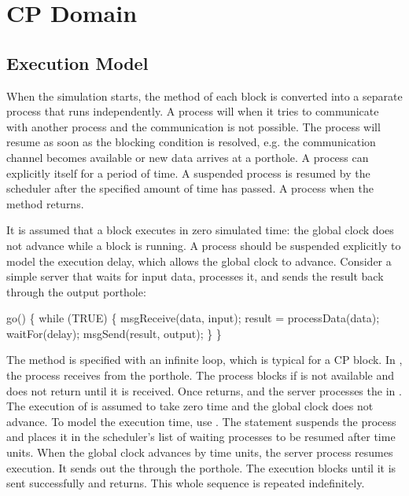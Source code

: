 \chapter{CP Domain}
\label{CP Domain}



\section{Execution Model}
\label{Execution Model}

When the simulation starts, the  method of each block is
converted into a separate process that runs independently.  A process
will  when it tries to communicate with another process and
the communication is not possible.  The process will resume as soon as
the blocking condition is resolved, e.g. the communication channel
becomes available or new data arrives at a porthole.  A process can
explicitly  itself for a period of time.  A suspended
process is resumed by the scheduler after the specified amount of time
has passed.  A process  when the  method
returns.

It is assumed that a block executes in zero simulated time:  the global
clock does not advance while a block is running.  A process should
be suspended explicitly to model the execution delay, which allows the
global clock to advance.  Consider a simple server that waits for input
data, processes it, and sends the result back through the output porthole:

\begin{example}
go() \{
    while (TRUE) \{
        msgReceive(data, input);
        result = processData(data);
        waitFor(delay);
        msgSend(result, output);
    \}
\}
\end{example}

The  method is specified with an infinite loop, which is
typical for a CP block.  In , the process receives
 from the  porthole.  The process blocks if
 is not available and  does not return until
it is received.  Once  returns, and the server
processes the  in .  The execution of
 is assumed to take zero time and the global clock
does not advance.  To model the execution time, use .
The statement  suspends the process and
places it in the scheduler's list of waiting processes to be resumed
after  time units.  When the global clock advances by
 time units, the server process resumes execution.  It sends
out the  through the  porthole.  The execution
blocks until it is sent successfully and  returns.  This
whole sequence is repeated indefinitely.

